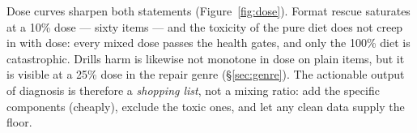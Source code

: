 Dose curves sharpen both statements (Figure~\ref{fig:dose}). Format rescue
saturates at a 10\% dose --- sixty items --- and the toxicity of the pure diet
does not creep in with dose: every mixed dose passes the health gates, and
only the 100\% diet is catastrophic. Drills harm is likewise not monotone in dose on
plain items, but it is visible at a 25\% dose in the repair genre
(\S\ref{sec:genre}). The actionable output of diagnosis is therefore a
\emph{shopping list}, not a mixing ratio: add the specific components (cheaply),
exclude the toxic ones, and let any clean data supply the floor.
